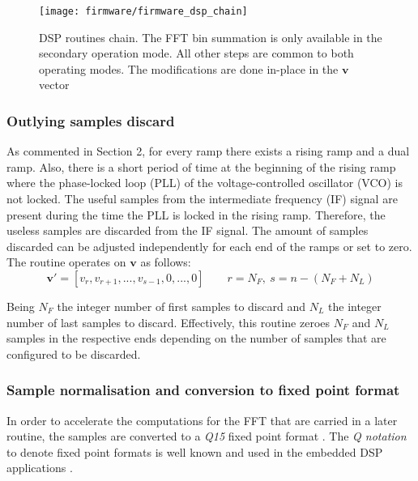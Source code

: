 \begin{figure}[ht]
	\centering
	\texttt{[image: firmware/firmware\_dsp\_chain]}
	\caption{DSP routines chain. The FFT bin summation is only available in the secondary operation mode. All other steps are common to both operating modes. The modifications are done in-place in the $\mathbf{v}$ vector}
	\label{fig:firmware_dsp_chain}
\end{figure}

\subsubsection{Outlying samples discard}

As commented in Section 2, for every ramp there exists a rising ramp and a dual ramp. Also, there is a short period of time at the beginning of the rising ramp where the phase-locked loop (PLL) of the voltage-controlled oscillator (VCO) is not locked. The useful samples from the intermediate frequency (IF) signal are present during the time the PLL is locked in the rising ramp. Therefore, the useless samples are discarded from the IF signal. The amount of samples discarded can be adjusted independently for each end of the ramps or set to zero. The routine operates on $\mathbf{v}$ as follows:
\begin{equation}
	\mathbf{v'} = [v_{r}, v_{r+1}, ..., v_{s-1}, 0, ..., 0] \qquad r = N_F,\ s= n- (N_F+N_L)
\end{equation}

Being $N_F$ the integer number of first samples to discard and $N_L$ the integer number of last samples to discard. Effectively, this routine zeroes $N_F$ and $N_L$ samples in the respective ends depending on the number of samples that are configured to be discarded. %



\subsubsection{Sample normalisation and conversion to fixed point format}

In order to accelerate the computations for the FFT that are carried in a later routine, the samples are converted to a \textit{Q15} fixed point format \cite{ARMQ15}. The \textit{Q notation} to denote fixed point formats is well known and used in the embedded DSP applications \cite{ARMQ15}.

